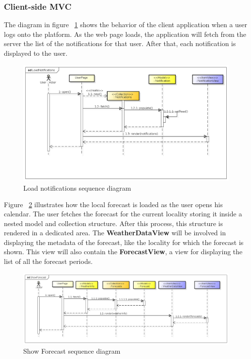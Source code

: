 \subsubsection{Client-side MVC}
The diagram in figure ~\ref{fig:loadnotifSeq} shows the behavior of the client application when a user logs onto the platform. As the web page loads, the application will fetch from the server the list of the notifications for that user. After that, each notification is displayed to the user.
 \begin{center}
 \begin{figure}[H]
    \includegraphics[width=1\textwidth]{../MVCDiagram/MVCBackbone/LoadNotifications.png}
    \caption{Load notifications sequence diagram}
     \label{fig:loadnotifSeq}
     \end{figure}
   \end{center} 
   
Figure ~\ref{fig:forecasteq} illustrates how the local forecast is loaded as the user opens his calendar. The user fetches the forecast for the current locality storing it inside a nested model and collection structure. After this process, this structure is rendered in a dedicated area. The \textbf{WeatherDataView} will be involved in displaying the metadata of the forecast, like the locality for which the forecast is shown. This view will also contain the \textbf{ForecastView}, a view for displaying the list of all the forecast periods.
 \begin{center}
 \begin{figure}[H]
    \includegraphics[width=1\textwidth]{../MVCDiagram/MVCBackbone/ShowForecast.png}
    \caption{Show Forecast sequence diagram}
     \label{fig:forecasteq}
     \end{figure}
   \end{center} 
   
   

